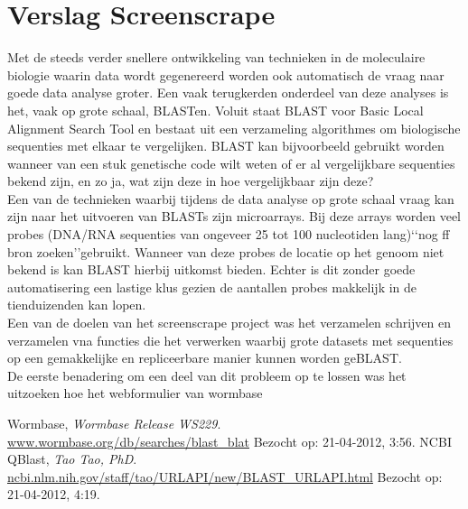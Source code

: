 \documentclass[a4paper]{article}
\begin{document}
\section*{Verslag Screenscrape}

Met de steeds verder snellere ontwikkeling van technieken in de moleculaire biologie waarin data wordt gegenereerd worden ook automatisch de vraag naar goede data analyse groter. Een vaak terugkerden onderdeel van deze analyses is het, vaak op grote schaal, BLASTen. Voluit staat BLAST voor Basic Local Alignment Search Tool en bestaat uit een verzameling algorithmes om biologische sequenties met elkaar te vergelijken. BLAST kan bijvoorbeeld gebruikt worden wanneer van een stuk genetische code wilt weten of er al vergelijkbare sequenties bekend zijn, en zo ja, wat zijn deze in hoe vergelijkbaar zijn deze?\\

Een van de technieken waarbij tijdens de data analyse op grote schaal vraag kan zijn naar het uitvoeren van BLASTs zijn microarrays. Bij deze arrays worden veel probes (DNA/RNA sequenties van ongeveer 25 tot 100 nucleotiden lang)\lq\lq nog ff bron zoeken\rq\rq gebruikt. Wanneer van deze probes de locatie op het genoom niet bekend is kan BLAST hierbij uitkomst bieden. Echter is dit zonder goede automatisering een lastige klus gezien de aantallen probes makkelijk in de tienduizenden kan lopen.\\

Een van de doelen van het screenscrape project was het verzamelen schrijven en verzamelen vna functies die het verwerken waarbij grote datasets met sequenties op een gemakkelijke en repliceerbare manier kunnen worden geBLAST.\\

De eerste benadering om een deel van dit probleem op te lossen was het uitzoeken hoe het webformulier van wormbase\cite{Wormbase} \\

\renewcommand{\refname}{Referenties}

\begin{thebibliography}{9}
    Wormbase, \emph{Wormbase Release WS229}. \url{www.wormbase.org/db/searches/blast_blat} Bezocht op: 21-04-2012, 3:56.
    NCBI QBlast, \emph{Tao Tao, PhD}. \url{ncbi.nlm.nih.gov/staff/tao/URLAPI/new/BLAST_URLAPI.html} Bezocht op: 21-04-2012, 4:19.
\end{thebibliography}
\end{document}
